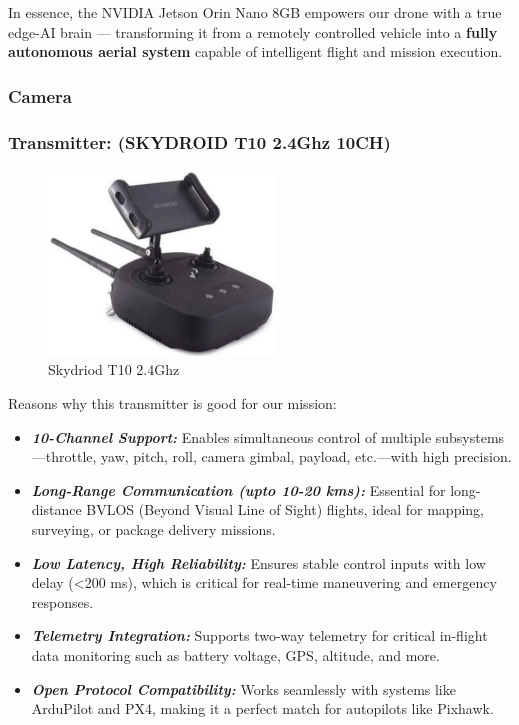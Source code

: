 \documentclass[12pt]{report}
\begin{document}
      In essence, the NVIDIA Jetson Orin Nano 8GB empowers our drone with a true edge-AI brain — transforming it from a remotely controlled vehicle into a \textbf{fully autonomous aerial system} capable of intelligent flight and mission execution.

      \subsubsection{Camera}
      \subsubsection{\large Transmitter: (SKYDROID T10 2.4Ghz 10CH)}
      \begin{figure}
          \includegraphics[width=1\linewidth]{transmitter.png}
          \caption{Skydriod T10 2.4Ghz}
          \label{fig:skydriod}
        \end{figure}

      Reasons why this transmitter is good for our mission:
      \begin{itemize}
        \item \textbf{\textit{10-Channel Support:}} Enables simultaneous control of multiple subsystems—throttle, yaw, pitch, roll, camera gimbal, payload, etc.—with high precision.
        \item \textbf{\textit{Long-Range Communication (upto 10-20 kms):}} Essential for long-distance BVLOS (Beyond Visual Line of Sight) flights, ideal for mapping, surveying, or package delivery missions.
        \item \textbf{\textit{Low Latency, High Reliability:}} Ensures stable control inputs with low delay (<200 ms), which is critical for real-time maneuvering and emergency responses.
        \item \textbf{\textit{Telemetry Integration:}} Supports two-way telemetry for critical in-flight data monitoring such as battery voltage, GPS, altitude, and more.
        \item \textbf{\textit{Open Protocol Compatibility:}} Works seamlessly with systems like ArduPilot and PX4, making it a perfect match for autopilots like Pixhawk.
      \end{itemize}
\end{document}
